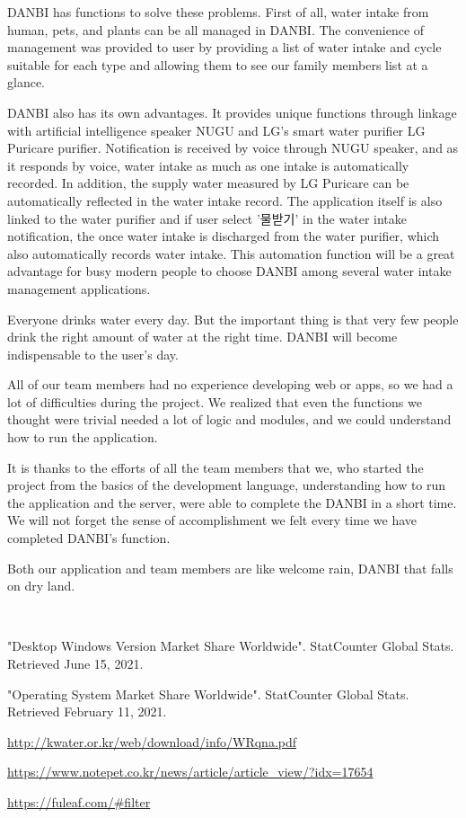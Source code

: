 \documentclass[conference]{IEEEtran}
\begin{document}
DANBI has functions to solve these problems. First of all, water intake from human, pets, and plants can be all managed in DANBI. The convenience of management was provided to user by providing a list of water intake and cycle suitable for each type and allowing them to see our family members list at a glance.

DANBI also has its own advantages. It provides unique functions through linkage with artificial intelligence speaker NUGU and LG's smart water purifier LG Puricare purifier. Notification is received by voice through NUGU speaker, and as it responds by voice, water intake as much as one intake is automatically recorded. In addition, the supply water measured by LG Puricare can be automatically reflected in the water intake record. The application itself is also linked to the water purifier and if user select '물받기' in the water intake notification, the once water intake is discharged from the water purifier, which also automatically records water intake. This automation function will be a great advantage for busy modern people to choose DANBI among several water intake management applications.

Everyone drinks water every day. But the important thing is that very few people drink the right amount of water at the right time. DANBI will become indispensable to the user's day.

All of our team members had no experience developing web or apps, so we had a lot of difficulties during the project. We realized that even the functions we thought were trivial needed a lot of logic and modules, and we could understand how to run the application.

It is thanks to the efforts of all the team members that we, who started the project from the basics of the development language, understanding how to run the application and the server, were able to complete the DANBI in a short time. We will not forget the sense of accomplishment we felt every time we have completed DANBI's function.

Both our application and team members are like welcome rain, DANBI that falls on dry land.

\ 

\begin{thebibliography}{00}
 "Desktop Windows Version Market Share Worldwide". StatCounter Global Stats. Retrieved June 15, 2021.

 "Operating System Market Share Worldwide". StatCounter Global Stats. Retrieved February 11, 2021.

\url{http://kwater.or.kr/web/download/info/WRqna.pdf}

\url{https://www.notepet.co.kr/news/article/article_view/?idx=17654}

\url{https://fuleaf.com/#filter}



\end{thebibliography}

\ 

\thispagestyle{empty}
\listoffigures
\listoftables
\clearpage
{}
\end{document}
